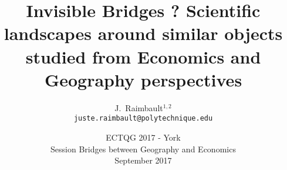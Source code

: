 \documentclass[english,11pt]{beamer}
\begin{document}
\title{Invisible Bridges ? Scientific landscapes around similar objects studied from Economics and Geography perspectives}

\author{J.~Raimbault$^{1,2}$\\
\texttt{juste.raimbault@polytechnique.edu}
}




\date{ECTQG 2017 - York\\\smallskip
Session Bridges between Geography and Economics\\\smallskip
September 2017
}

\frame{\maketitle}







\end{document}

